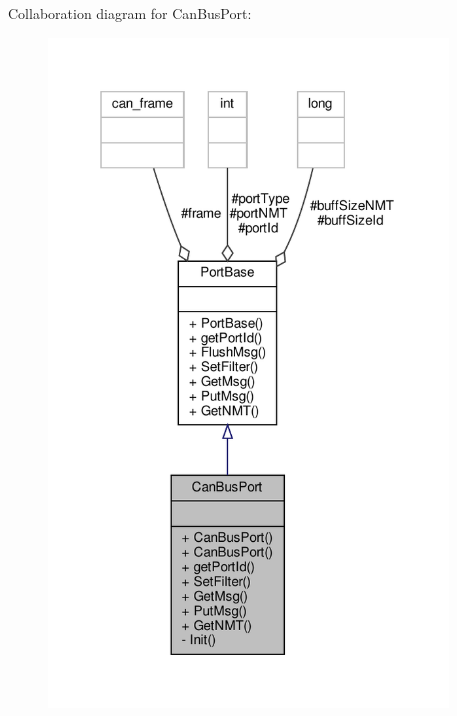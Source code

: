 Collaboration diagram for Can\+Bus\+Port\+:
\nopagebreak
\begin{figure}[H]
\begin{center}
\leavevmode
\includegraphics[width=301pt]{classCanBusPort__coll__graph}
\end{center}
\end{figure}
